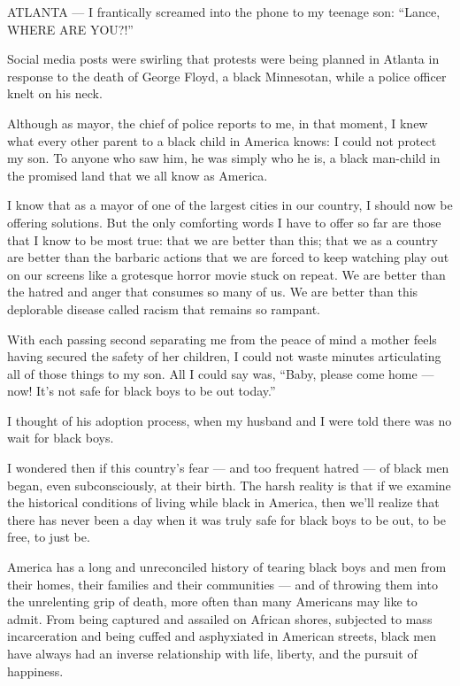 ATLANTA --- I frantically screamed into the phone to my teenage son:
``Lance, WHERE ARE YOU?!''

Social media posts were swirling that protests were being planned in
Atlanta in response to the death of George Floyd, a black Minnesotan,
while a police officer knelt on his neck.

Although as mayor, the chief of police reports to me, in that moment, I
knew what every other parent to a black child in America knows: I could
not protect my son. To anyone who saw him, he was simply who he is, a
black man-child in the promised land that we all know as America.

I know that as a mayor of one of the largest cities in our country, I
should now be offering solutions. But the only comforting words I have
to offer so far are those that I know to be most true: that we are
better than this; that we as a country are better than the barbaric
actions that we are forced to keep watching play out on our screens like
a grotesque horror movie stuck on repeat. We are better than the hatred
and anger that consumes so many of us. We are better than this
deplorable disease called racism that remains so rampant.

With each passing second separating me from the peace of mind a mother
feels having secured the safety of her children, I could not waste
minutes articulating all of those things to my son. All I could say was,
``Baby, please come home --- now! It's not safe for black boys to be out
today.''

I thought of his adoption process, when my husband and I were told there
was no wait for black boys.

I wondered then if this country's fear --- and too frequent hatred ---
of black men began, even subconsciously, at their birth. The harsh
reality is that if we examine the historical conditions of living while
black in America, then we'll realize that there has never been a day
when it was truly safe for black boys to be out, to be free, to just be.

America has a long and unreconciled history of tearing black boys and
men from their homes, their families and their communities --- and of
throwing them into the unrelenting grip of death, more often than many
Americans may like to admit. From being captured and assailed on African
shores, subjected to mass incarceration and being cuffed and asphyxiated
in American streets, black men have always had an inverse relationship
with life, liberty, and the pursuit of happiness.

